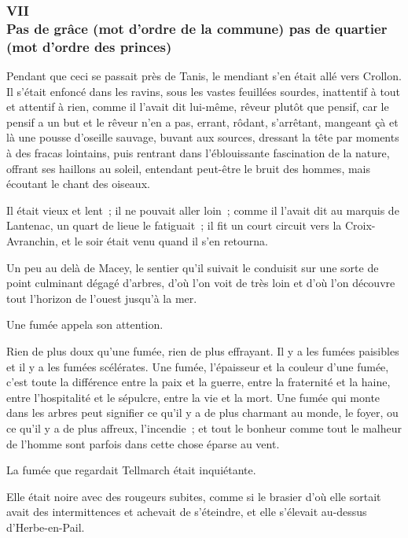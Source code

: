\documentclass[french,twoside]{book} %
\begin{document}
 \subsubsection[{VII. Pas de grâce (mot d’ordre de la commune) pas de quartier (mot d’ordre des princes)}]{VII \\
Pas de grâce (mot d’ordre de la commune) pas de quartier (mot d’ordre des princes)}
\label{p1l4c7}
\noindent Pendant que ceci se passait près de Tanis, le mendiant s’en était allé vers Crollon. Il s’était enfoncé dans les ravins, sous les vastes feuillées sourdes, inattentif à tout et attentif à rien, comme il l’avait dit lui-même, rêveur plutôt que pensif, car le pensif a un but et le rêveur n’en a pas, errant, rôdant, s’arrêtant, mangeant çà et là une pousse d’oseille sauvage, buvant aux sources, dressant la tête par moments à des fracas lointains, puis rentrant dans l’éblouissante fascination de la nature, offrant ses haillons au soleil, entendant peut-être le bruit des hommes, mais écoutant le chant des oiseaux.\par
Il était vieux et lent ; il ne pouvait aller loin ; comme il l’avait dit au marquis de Lantenac, un quart de lieue le fatiguait ; il fit un court circuit vers la Croix-Avranchin, et le soir était venu quand il s’en retourna.\par
Un peu au delà de Macey, le sentier qu’il suivait le conduisit sur une sorte de point culminant dégagé d’arbres, d’où l’on voit de très loin et d’où l’on découvre tout l’horizon de l’ouest jusqu’à la mer.\par
 Une fumée appela son attention.\par
Rien de plus doux qu’une fumée, rien de plus effrayant. Il y a les fumées paisibles et il y a les fumées scélérates. Une fumée, l’épaisseur et la couleur d’une fumée, c’est toute la différence entre la paix et la guerre, entre la fraternité et la haine, entre l’hospitalité et le sépulcre, entre la vie et la mort. Une fumée qui monte dans les arbres peut signifier ce qu’il y a de plus charmant au monde, le foyer, ou ce qu’il y a de plus affreux, l’incendie ; et tout le bonheur comme tout le malheur de l’homme sont parfois dans cette chose éparse au vent.\par
La fumée que regardait Tellmarch était inquiétante.\par
Elle était noire avec des rougeurs subites, comme si le brasier d’où elle sortait avait des intermittences et achevait de s’éteindre, et elle s’élevait au-dessus d’Herbe-en-Pail.\par
\end{document}
